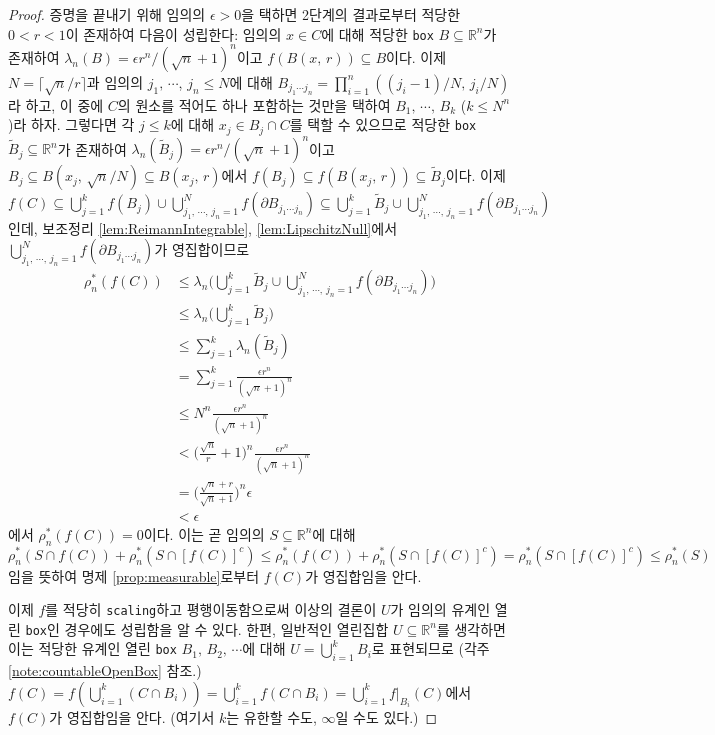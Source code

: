 \begin{proof}
    증명을 끝내기 위해 임의의 $\epsilon>0$을 택하면 2단계의 결과로부터 적당한 $0<r<1$이 존재하여 다음이 성립한다: 임의의 $x\in C$에 대해 적당한 \texttt{box} $B\subseteq\mathbb{R}^n$가 존재하여 $\lambda_n(B)=\epsilon r^n/(\sqrt{n}+1)^n$이고 $f(B(x,\,r))\subseteq B$이다. 이제 $N=\lceil\sqrt{n}/r\rceil$과 임의의 $j_1,\,\cdots$, $j_n\leq N$에 대해 $B_{j_1\cdots j_n}=\prod_{i=1}^n((j_i-1)/N,\,j_i/N)$라 하고, 이 중에 $C$의 원소를 적어도 하나 포함하는 것만을 택하여 $B_1,\,\cdots,\,B_k$ ($k\leq N^n$)라 하자. 그렇다면 각 $j\leq k$에 대해 $x_j\in B_j\cap C$를 택할 수 있으므로 적당한 \texttt{box} $\widetilde{B}_j\subseteq\mathbb{R}^n$가 존재하여 $\lambda_n(\widetilde{B}_j)=\epsilon r^n/(\sqrt{n}+1)^n$이고 $B_j\subseteq B(x_j,\,\sqrt{n}/N)\subseteq B(x_j,\,r)$에서 $f(B_j)\subseteq f(B(x_j,\,r))\subseteq \widetilde{B}_j$이다. 이제 $f(C)\subseteq\bigcup_{j=1}^kf(B_j)\cup\bigcup_{j_1,\,\cdots,\,j_n=1}^Nf(\partial B_{j_1\cdots j_n})\subseteq\bigcup_{j=1}^k\widetilde{B}_j\cup\bigcup_{j_1,\,\cdots,\,j_n=1}^Nf(\partial B_{j_1\cdots j_n})$인데, 보조정리 \ref{lem:ReimannIntegrable}, \ref{lem:LipschitzNull}에서 $\bigcup_{j_1,\,\cdots,\,j_n=1}^Nf(\partial B_{j_1\cdots j_n})$가 영집합이므로
    \begin{align*}
        \rho_n^*(f(C))&\leq\lambda_n\bigg(\bigcup_{j=1}^k\widetilde{B}_j\cup \bigcup_{j_1,\,\cdots,\,j_n=1}^Nf(\partial B_{j_1\cdots j_n})\bigg)\\
        &\leq\lambda_n\bigg(\bigcup_{j=1}^k\widetilde{B}_j\bigg)\\
        &\leq\sum_{j=1}^k\lambda_n(\widetilde{B}_j)\\
        &=\sum_{j=1}^k\frac{\epsilon r^n}{(\sqrt{n}+1)^n}\\
        &\leq N^n\frac{\epsilon r^n}{(\sqrt{n}+1)^n}\\
        &<\bigg(\frac{\sqrt{n}}{r}+1\bigg)^n\frac{\epsilon r^n}{(\sqrt{n}+1)^n}\\
        &=\bigg(\frac{\sqrt{n}+r}{\sqrt{n}+1}\bigg)^n\epsilon\\
        &<\epsilon
    \end{align*}
    에서 $\rho_n^*(f(C))=0$이다. 이는 곧 임의의 $S\subseteq\mathbb{R}^n$에 대해 $\rho_n^*(S\cap f(C))+\rho_n^*(S\cap[f(C)]^c)\leq\rho_n^*(f(C))+\rho_n^*(S\cap[f(C)]^c)=\rho_n^*(S\cap[f(C)]^c)\leq\rho_n^*(S)$임을 뜻하여 명제 \ref{prop:measurable}로부터 $f(C)$가 영집합임을 안다.

    이제 $f$를 적당히 \texttt{scaling}하고 평행이동함으로써 이상의 결론이 $U$가 임의의 유계인 열린 \texttt{box}인 경우에도 성립함을 알 수 있다. 한편, 일반적인 열린집합 $U\subseteq\mathbb{R}^n$를 생각하면 이는 적당한 유계인 열린 \texttt{box} $B_1,\,B_2,\,\cdots$에 대해 $U=\bigcup_{i=1}^kB_i$로 표현되므로 (각주 \ref{note:countableOpenBox} 참조.) $f(C)=f(\bigcup_{i=1}^k(C\cap B_i))=\bigcup_{i=1}^kf(C\cap B_i)=\bigcup_{i=1}^kf\vert_{B_i}(C)$에서 $f(C)$가 영집합임을 안다. (여기서 $k$는 유한할 수도, $\infty$일 수도 있다.)
\end{proof}


